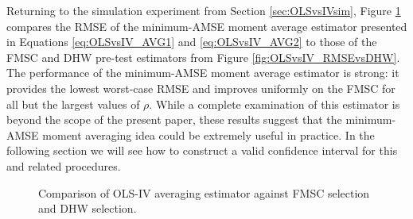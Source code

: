 Returning to the simulation experiment from Section \ref{sec:OLSvsIVsim}, Figure \ref{fig:OLSvsIV_AVG} compares the RMSE of the minimum-AMSE moment average estimator presented in Equations \ref{eq:OLSvsIV_AVG1} and \ref{eq:OLSvsIV_AVG2} to those of the FMSC and DHW pre-test estimators from Figure \ref{fig:OLSvsIV_RMSEvsDHW}.
The performance of the minimum-AMSE moment average estimator is strong: it provides the lowest worst-case RMSE and improves uniformly on the FMSC for all but the largest values of $\rho$.
While a complete examination of this estimator is beyond the scope of the present paper, these results suggest that the minimum-AMSE moment averaging idea could be extremely useful in practice.
In the following section we will see how to construct a valid confidence interval for this and related procedures.
\begin{figure}
\centering
	
	\caption{Comparison of OLS-IV averaging estimator against FMSC selection and DHW selection.}
	\label{fig:OLSvsIV_AVG}
\end{figure}